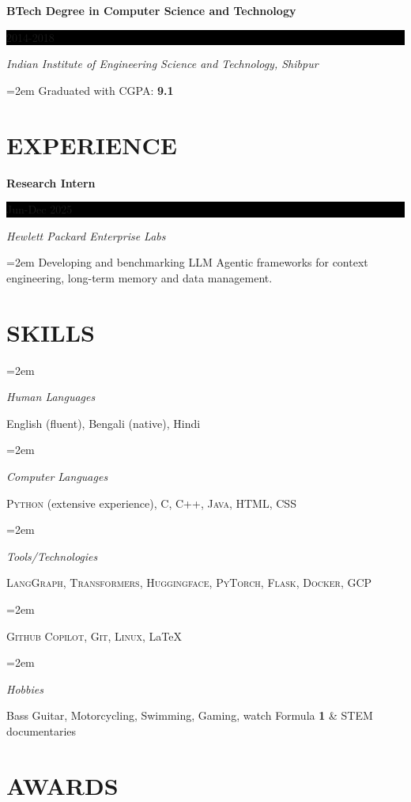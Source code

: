 \documentclass[paper=a4,fontsize=10pt]{scrartcl} %
\newlength{\spacebox}
\newcommand{\sepspace}{\vspace*{0.6em}}		%
\newcommand{\NewPart}[1]{\section*{\uppercase{#1}}}
\newcommand{\PersonalEntry}[2]{
		\noindent\hangindent=2em\hangafter=0 %
		\parbox{\spacebox}{        %
		\textit{#1}}		       %
		\hspace{1.5em} #2 \par}    %
\newcommand{\SkillsEntry}[2]{      %
		\noindent\hangindent=2em\hangafter=0 %
		\parbox{\spacebox}{        %
		\textit{#1}}			   %
		\hspace{1.5em} #2 \par}    %
\newcommand{\EducationEntry}[4]{
		\noindent \textbf{#1} \hfill      %
		\colorbox{Black}{%
			\parbox{6em}{%
			\hfill\color{White}#2}} \par  %
		\noindent \textit{#3} \par        %
		\noindent\hangindent=2em\hangafter=0 \small #4 %
		\normalsize \par}
\begin{document}
\EducationEntry{BTech Degree in Computer Science and Technology}{2014-2018}{Indian Institute of Engineering Science and Technology, Shibpur}{Graduated with CGPA: \textbf{9.1} }



\vspace*{-2mm}


\NewPart{Experience}{}

\vspace*{-1mm}

\EducationEntry{Research Intern}{Jun-Dec 2025}{Hewlett Packard Enterprise Labs}{Developing and benchmarking LLM Agentic frameworks for context engineering, long-term memory and data management.} 

\vspace*{-2mm}



\NewPart{Skills}{}

\vspace*{-1mm}

\SkillsEntry{Human Languages}{English (fluent), Bengali (native), Hindi}

\SkillsEntry{Computer Languages}{\textsc{Python} (extensive experience), \textsc{C}, \textsc{C++}, \textsc{Java}, \textsc{HTML}, \textsc{CSS}}

\SkillsEntry{Tools/Technologies}{\textsc{LangGraph}, \textsc{Transformers}, \textsc{Huggingface}, \textsc{PyTorch}, \textsc{Flask}, \textsc{Docker}, \textsc{GCP}}


\SkillsEntry{}{\textsc{Github Copilot}, \textsc{Git}, \textsc{Linux}, \LaTeX
}




\SkillsEntry{Hobbies}{Bass Guitar, Motorcycling, Swimming, Gaming, watch Formula \textbf{1} \& STEM documentaries}


\vspace*{-2mm}



\NewPart{Awards}{}
\end{document}
